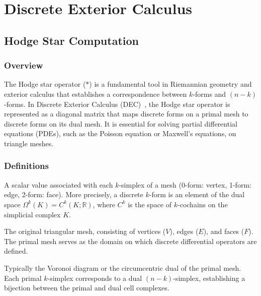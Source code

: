\chapter{Discrete Exterior Calculus}
\label{ch:discrete_exterior}

\section{Hodge Star Computation}
\label{sec:hodge_star}

\subsection{Overview}
The Hodge star operator ($*$) is a fundamental tool in Riemannian geometry and exterior calculus that establishes a correspondence between $k$-forms and $(n-k)$-forms. In Discrete Exterior Calculus (DEC)~\cite{desbrun2005,crane2013}, the Hodge star operator is represented as a diagonal matrix that maps discrete forms on a primal mesh to discrete forms on its dual mesh. It is essential for solving partial differential equations (PDEs), such as the Poisson equation or Maxwell's equations, on triangle meshes.

\subsection{Definitions}
\begin{definition}\label{def:discrete_k_form}
A scalar value associated with each $k$-simplex of a mesh (0-form: vertex, 1-form: edge, 2-form: face). More precisely, a discrete $k$-form is an element of the dual space $\Omega^k(K) = C^k(K; \mathbb{R})$, where $C^k$ is the space of $k$-cochains on the simplicial complex $K$.
\end{definition}

\begin{definition}\label{def:primal_mesh}
The original triangular mesh, consisting of vertices ($V$), edges ($E$), and faces ($F$). The primal mesh serves as the domain on which discrete differential operators are defined.
\end{definition}

\begin{definition}\label{def:dual_mesh}
Typically the Voronoi diagram or the circumcentric dual of the primal mesh. Each primal $k$-simplex corresponds to a dual $(n-k)$-simplex, establishing a bijection between the primal and dual cell complexes.
\end{definition}

